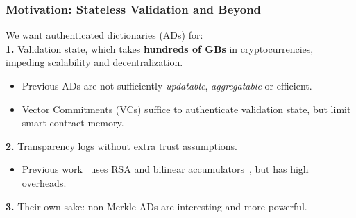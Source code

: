 \begin{frame}
    \frametitle{Motivation: Stateless Validation and Beyond}
    We want \alert{authenticated dictionaries (ADs)}\pause\xspace for:\\
    \vspace{1em}
    \textbf{1.} \alert{Validation state}, which takes \textbf{hundreds of GBs} in cryptocurrencies, impeding scalability and decentralization.\pause
    \begin{itemize}
        \item Previous ADs are not sufficiently \textit{updatable}, \textit{aggregatable} or efficient.\pause
        \item \alert{Vector Commitments (VCs)} suffice to authenticate validation state, but limit smart contract memory.\pause
    \end{itemize}
    \textbf{2.} \alert{Transparency logs} without extra trust assumptions.\pause
    \begin{itemize}
        \item Previous work~\cite{TBP+19,Tome20} uses \alert{RSA} and \alert{bilinear accumulators}~\cite{Bd93,Nguyen05}, but has high overheads.\pause
    \end{itemize}
    \textbf{3.} Their own sake: non-Merkle ADs are interesting and more powerful.
\end{frame}